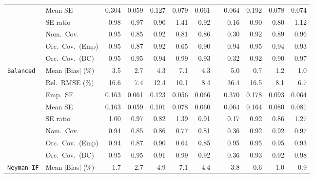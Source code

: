 \begin{landscape}
\begin{longtable}{llrrrrrrrrrr}
 & Mean SE & 0.304 & 0.059 & 0.127 & 0.079 & 0.061 &  & 0.064 & 0.192 & 0.078 & 0.074 \\
 & SE ratio & \cellcolor{rankone}0.98 & \cellcolor{ranktwo}0.97 & 0.90 & 1.41 & \cellcolor{rankthree}0.92 &  & 0.16 & 0.90 & 0.80 & 1.12 \\
 & Nom.\ Cov. & \cellcolor{rankone}0.95 & 0.85 & \cellcolor{rankthree}0.92 & 0.81 & 0.86 &  & 0.30 & \cellcolor{rankthree}0.92 & 0.89 & \cellcolor{ranktwo}0.96 \\
 & Orc.\ Cov.\ (Emp) & \cellcolor{rankone}0.95 & 0.87 & 0.92 & 0.65 & 0.90 &  & \cellcolor{ranktwo}0.94 & \cellcolor{rankone}0.95 & \cellcolor{ranktwo}0.94 & \cellcolor{rankthree}0.93 \\
 & Orc.\ Cov.\ (BC) & \cellcolor{rankone}0.95 & \cellcolor{rankone}0.95 & \cellcolor{ranktwo}0.94 & 0.99 & \cellcolor{rankthree}0.93 &  & 0.32 & 0.92 & 0.90 & \cellcolor{rankthree}0.97 \\
\addlinespace[2pt]
\quad \texttt{Balanced} & Mean $|$Bias$|$ (\%) & 3.5 & 2.7 & 4.3 & 7.1 & 4.3 &  & 5.0 & \cellcolor{rankone}0.7 & \cellcolor{rankthree}1.2 & \cellcolor{ranktwo}1.0 \\
 & Rel.\ RMSE (\%) & 16.6 & \cellcolor{ranktwo}7.4 & 12.4 & 10.1 & 8.4 &  & 36.4 & 16.5 & \cellcolor{rankthree}8.1 & \cellcolor{rankone}6.7 \\
 & Emp.\ SE & 0.163 & 0.061 & 0.123 & 0.056 & 0.066 &  & 0.370 & 0.178 & 0.093 & 0.064 \\
 & Mean SE & 0.163 & 0.059 & 0.101 & 0.078 & 0.060 &  & 0.064 & 0.164 & 0.080 & 0.081 \\
 & SE ratio & \cellcolor{rankone}1.00 & \cellcolor{ranktwo}0.97 & 0.82 & 1.39 & 0.91 &  & 0.17 & \cellcolor{rankthree}0.92 & 0.86 & 1.27 \\
 & Nom.\ Cov. & \cellcolor{rankone}0.94 & 0.85 & 0.86 & 0.77 & 0.81 &  & 0.36 & \cellcolor{rankthree}0.92 & \cellcolor{rankthree}0.92 & \cellcolor{ranktwo}0.97 \\
 & Orc.\ Cov.\ (Emp) & \cellcolor{ranktwo}0.94 & 0.87 & 0.90 & 0.64 & 0.85 &  & \cellcolor{rankone}0.95 & \cellcolor{rankone}0.95 & \cellcolor{rankone}0.95 & \cellcolor{rankthree}0.93 \\
 & Orc.\ Cov.\ (BC) & \cellcolor{rankone}0.95 & \cellcolor{rankone}0.95 & 0.91 & 0.99 & \cellcolor{rankthree}0.92 &  & 0.36 & \cellcolor{ranktwo}0.93 & \cellcolor{rankthree}0.92 & \cellcolor{rankthree}0.98 \\
\addlinespace[2pt]
\quad \texttt{Neyman-IF} & Mean $|$Bias$|$ (\%) & 1.7 & 2.7 & 4.9 & 7.1 & 4.4 &  & 3.8 & \cellcolor{rankone}0.6 & \cellcolor{rankthree}1.0 & \cellcolor{ranktwo}0.9 \\

\end{longtable}
\end{landscape}
